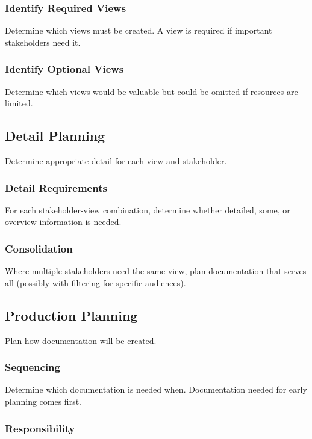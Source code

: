 \documentclass[11pt]{article}
\begin{document}
\subsubsection{Identify Required Views}

Determine which views must be created. A view is required if important stakeholders need it.

\subsubsection{Identify Optional Views}

Determine which views would be valuable but could be omitted if resources are limited.

\subsection{Detail Planning}

Determine appropriate detail for each view and stakeholder.

\subsubsection{Detail Requirements}

For each stakeholder-view combination, determine whether detailed, some, or overview information is needed.

\subsubsection{Consolidation}

Where multiple stakeholders need the same view, plan documentation that serves all (possibly with filtering for specific audiences).

\subsection{Production Planning}

Plan how documentation will be created.

\subsubsection{Sequencing}

Determine which documentation is needed when. Documentation needed for early planning comes first.

\subsubsection{Responsibility}
\end{document}
